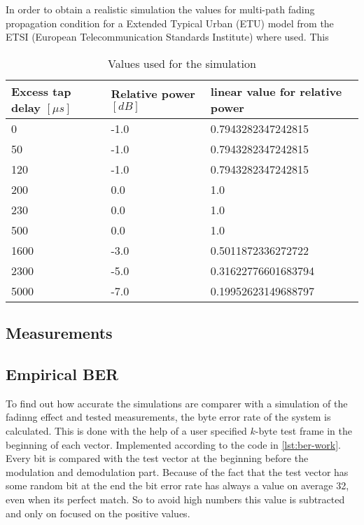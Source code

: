 
In order to obtain a realistic simulation the values for multi-path fading propagation condition for a Extended Typical Urban (ETU) model from the ETSI (European Telecommunication Standards Institute) where used. This 

\begin{table}[b]
	
	\centering
	\begin{tabular}{lll}
		\toprule
		Excess tap delay \([\mu s]\) & Relative power \([dB]\) & linear value for relative power  \\     
		\midrule
		0	 & -1.0	& 0.7943282347242815	\\
		50   & -1.0	& 0.7943282347242815	\\
		120  & -1.0	& 0.7943282347242815	\\
		200  &  0.0	& 1.0					\\
		230  & 	0.0 & 1.0					\\
		500  & 	0.0	& 1.0					\\
		1600 & -3.0 & 0.5011872336272722	\\
		2300 & -5.0	& 0.31622776601683794	\\
		5000 & -7.0 & 0.19952623149688797	\\

		\bottomrule
	\end{tabular}
	\caption{Values used for the simulation\label{tab:values}}
\end{table}




\subsection{Measurements}


\subsection{Empirical BER} \label{sec:ber}
To find out how accurate the simulations are comparer with a simulation of the fadinng effect and tested measurements, the byte error rate of the system is calculated. This is done with the help of a user specified \(k\)-byte test frame in the beginning of each vector. Implemented according to the code in \ref{lst:ber-work}. Every bit is compared with the test vector at the beginning before the modulation and demodulation part. 
Because of the fact that the test vector has some random bit at the end the bit error rate has always a value on average 32, even when its perfect match.  So to avoid high numbers this value is subtracted and only on focused on the positive values. 

